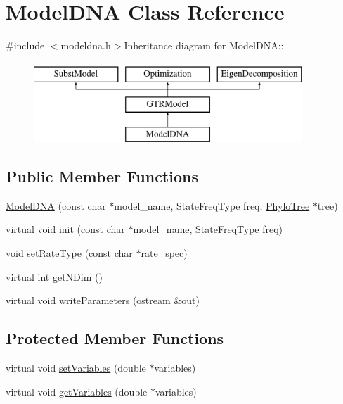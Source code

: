 \hypertarget{classModelDNA}{
\section{ModelDNA Class Reference}
\label{classModelDNA}
}


{\ttfamily \#include $<$modeldna.h$>$}Inheritance diagram for ModelDNA::\begin{figure}[H]
\begin{center}
\leavevmode
\includegraphics[height=3cm]{classModelDNA}
\end{center}
\end{figure}
\subsection*{Public Member Functions}
\begin{DoxyCompactItemize}
\item 
\hyperlink{classModelDNA_a58ee74d1a55b85db517f65bfa865b4c6}{ModelDNA} (const char $\ast$model\_\-name, StateFreqType freq, \hyperlink{classPhyloTree}{PhyloTree} $\ast$tree)
\item 
virtual void \hyperlink{classModelDNA_ad7f5b56ae6499a222c01ad81e92e27a2}{init} (const char $\ast$model\_\-name, StateFreqType freq)
\item 
void \hyperlink{classModelDNA_a2a44458bfe1d673b6718f2b881682cee}{setRateType} (const char $\ast$rate\_\-spec)
\item 
virtual int \hyperlink{classModelDNA_adc73fda51fb0f02049ed891b29c3a951}{getNDim} ()
\item 
virtual void \hyperlink{classModelDNA_a46a8fd333239a3937e6116608e20cc78}{writeParameters} (ostream \&out)
\end{DoxyCompactItemize}
\subsection*{Protected Member Functions}
\begin{DoxyCompactItemize}
\item 
virtual void \hyperlink{classModelDNA_a83af5938f0b38371b6b971931b8748c2}{setVariables} (double $\ast$variables)
\item 
virtual void \hyperlink{classModelDNA_a4083dfee9b55936019483c5e9a4bb2f7}{getVariables} (double $\ast$variables)
\end{DoxyCompactItemize}
